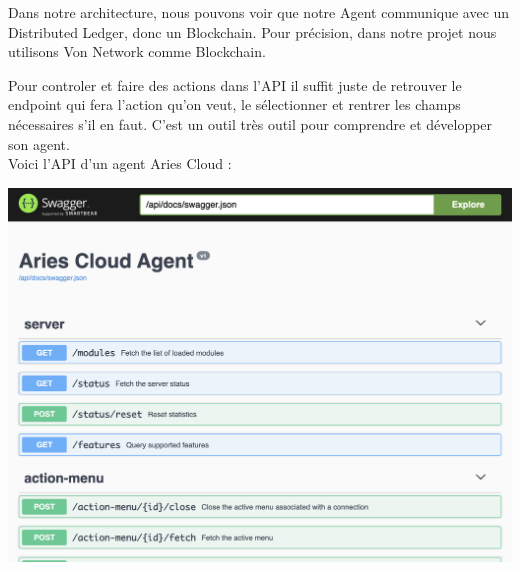 \documentclass[12pt, openany]{report}
\begin{document}
\vspace{5mm}
Dans notre architecture, nous pouvons voir que notre Agent communique avec un Distributed Ledger, donc un Blockchain. Pour précision, dans notre projet nous utilisons Von Network comme Blockchain.

\vspace{2mm}
Pour controler et faire des actions dans l'API il suffit juste de retrouver le endpoint qui fera l'action qu'on veut, le sélectionner et rentrer les champs nécessaires s'il en faut. C'est un outil très outil pour comprendre et développer son agent. \\
Voici l'API d'un agent Aries Cloud : 

\begin{center}
\includegraphics[scale=0.2]{adminApi.png}
\end{center}
\end{document}
